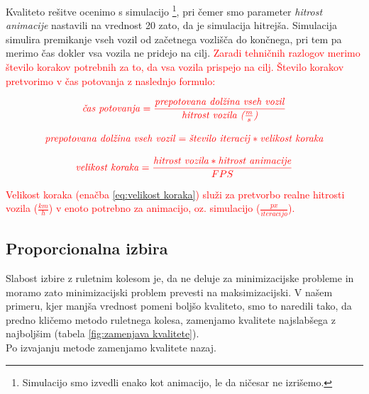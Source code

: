\documentclass[a4paper, 12pt]{book}
\begin{document}
Kvaliteto re\v sitve ocenimo s simulacijo \footnote{Simulacijo smo izvedli enako kot animacijo, le da ni\v cesar ne izri\v semo.}, pri \v cemer smo parameter \textit{hitrost animacije} nastavili na vrednost 20 zato, da je simulacija hitrej\v sa. Simulacija simulira premikanje vseh vozil od za\v cetnega vozli\v s\v ca do kon\v cnega, pri tem pa merimo \v cas dokler vsa vozila ne pridejo na cilj. \textcolor{red}{Zaradi tehni\v cnih razlogov merimo \v stevilo korakov potrebnih za to, da vsa vozila prispejo na cilj. \v Stevilo korakov pretvorimo v \v cas potovanja z naslednjo formulo:}

\begin{equation}
\textcolor{red}{\textrm{\textit{\v cas potovanja}} = \frac{\textrm{\textit{prepotovana dol\v zina vseh vozil}}}{\textrm{\textit{hitrost vozila ($\frac{m}{s}$)}}}}
\end{equation}

\begin{equation}
\textcolor{red}{\textrm{\textit{prepotovana dol\v zina vseh vozil}} = \textrm{\textit{\v stevilo iteracij}}*\textrm{\textit{velikost koraka}}}
\label{eq:prepotovana dolzina}
\end{equation}

\begin{equation}
\textcolor{red}{\textrm{\textit{velikost koraka}} = \frac{\textrm{\textit{hitrost vozila}}*\textrm{\textit{hitrost animacije}}}{FPS}}
\label{eq:velikost koraka}
\end{equation}

\textcolor{red}{Velikost koraka (ena\v cba \ref{eq:velikost koraka}) slu\v zi za pretvorbo realne hitrosti vozila ($\frac{km}{h}$) v enoto potrebno za animacijo, oz. simulacijo ($\frac{px}{iteracijo}$).}

\subsection{Proporcionalna izbira}
Slabost izbire z ruletnim kolesom je, da ne deluje za minimizacijske probleme in moramo zato minimizacijski problem prevesti na maksimizacijski. V na\v sem primeru, kjer manj\v sa vrednost pomeni bolj\v so kvaliteto, smo to naredili tako, da predno kli\v cemo metodo ruletnega kolesa, zamenjamo kvalitete najslab\v sega z najbolj\v sim (tabela \ref{fig:zamenjava kvalitete}).\\ Po izvajanju metode zamenjamo kvalitete nazaj.
\end{document}
